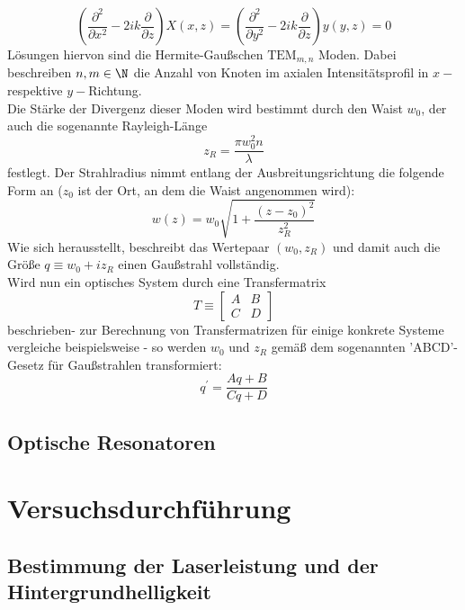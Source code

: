 \documentclass[11pt,a4paper,oneside]{scrartcl}
\begin{document}
\begin{equation}
\left(\frac{\partial^2}{\partial x^2}-2ik\frac{\partial}{\partial z}\right)X(x,z)=\left(\frac{\partial^2}{\partial y^2}-2ik\frac{\partial}{\partial z}\right)y(y,z)=0
\end{equation}
Lösungen hiervon sind die Hermite-Gaußschen $\mathrm{TEM}_{m,n}$ Moden. Dabei beschreiben $n,m\in\N$ die Anzahl von Knoten im axialen Intensitätsprofil in $x-$ respektive $y-$Richtung.\\
Die Stärke der Divergenz dieser Moden wird bestimmt durch den Waist $w_0$, der auch die sogenannte Rayleigh-Länge \begin{equation}\label{rayleigh} z_R=\frac{\pi w_0^2n}{\lambda}\end{equation}festlegt. Der Strahlradius nimmt entlang der Ausbreitungsrichtung die folgende Form an ($z_0$ ist der Ort, an dem die Waist angenommen wird):
\begin{equation}
\label{transv_profil}
w(z)=w_0\sqrt{1+\frac{(z-z_0)^2}{z_R^2}}
\end{equation}
Wie sich herausstellt, beschreibt das Wertepaar $(w_0,z_R)$ und damit auch die Größe $q\equiv w_0+iz_R$ einen Gaußstrahl vollständig.\\
Wird nun ein optisches System durch eine Transfermatrix \begin{equation}
T\equiv\begin{bmatrix}
A& B\\
C & D
\end{bmatrix}
\end{equation}
beschrieben- zur Berechnung von Transfermatrizen für einige konkrete Systeme vergleiche beispielsweise \cite{demtröder_2}- so werden $w_0$ und $z_R$ gemäß dem sogenannten 'ABCD'-Gesetz für Gaußstrahlen transformiert:
\begin{equation}\label{ABCD-Gesetz}
q^\prime = \frac{Aq+B}{Cq+D}
\end{equation}
\subsection{Optische Resonatoren}
\section{Versuchsdurchführung}
\subsection{Bestimmung der Laserleistung und der Hintergrundhelligkeit}
\end{document}
